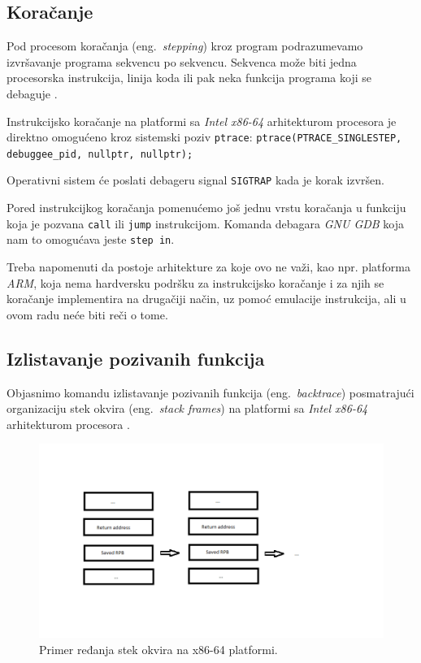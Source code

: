 \documentclass[12pt,oneside]{memoir}
\begin{document}
\subsection{Koračanje}

Pod procesom koračanja (eng.~\emph{stepping}) kroz program podrazumevamo izvršavanje programa sekvencu po sekvencu. Sekvenca može biti jedna procesorska instrukcija, linija koda ili pak neka funkcija programa koji se debaguje \cite{GDB}.

Instrukcijsko koračanje na platformi sa \emph{Intel x86-64} arhitekturom procesora je direktno omogućeno kroz sistemski poziv \texttt{ptrace}:\newline
\texttt{ptrace(PTRACE\_SINGLESTEP, debuggee\_pid, nullptr, nullptr);}
\newline

Operativni sistem će poslati debageru signal \texttt{SIGTRAP} kada je korak izvršen.

Pored instrukcijkog koračanja pomenućemo još jednu vrstu koračanja u funkciju koja je pozvana \texttt{call} ili \texttt{jump} instrukcijom. Komanda debagara \emph{GNU GDB} koja nam to omogućava jeste \texttt{step in}.

Treba napomenuti da postoje arhitekture za koje ovo ne važi, kao npr. platforma \emph{ARM}, koja nema hardversku podršku za instrukcijsko koračanje i za njih se koračanje implementira na drugačiji način, uz pomoć emulacije instrukcija, ali u ovom radu neće biti reči o tome.

\subsection{Izlistavanje pozivanih funkcija}

Objasnimo komandu izlistavanje pozivanih funkcija (eng.~\emph{backtrace}) posmatrajući organizaciju stek okvira (eng.~\emph{stack frames}) na platformi sa \emph{Intel x86-64} arhitekturom procesora \cite{GDB}.

\begin{figure}[h!]
	\begin{center}
		\includegraphics[scale=0.6]{slike/stack_frame.png}
	\end{center}
	\caption{Primer ređanja stek okvira na x86-64 platformi.}
	\label{fig:stack}
\end{figure}
\end{document}
